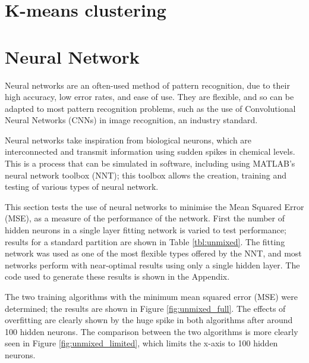 \documentclass[a4paper, 10pt, conference]{ieeeconf}
\begin{document}
\section{K-means clustering}

\section{Neural Network}


Neural networks are an often-used method of pattern recognition, due to their high accuracy, low error rates, and ease of use. They are flexible, and so can be adapted to most pattern recognition problems, such as the use of Convolutional Neural Networks (CNNs) in image recognition, an industry standard.

Neural networks take inspiration from biological neurons, which are interconnected and transmit information using sudden spikes in chemical levels. This is a process that can be simulated in software, including using MATLAB's neural network toolbox (NNT); this toolbox allows the creation, training and testing of various types of neural network.

This section tests the use of neural networks to minimise the Mean Squared Error (MSE), as a measure of the performance of the network. First the number of hidden neurons in a single layer fitting network is varied to test performance; results for a standard partition are shown in Table \ref{tbl:unmixed}. The fitting network was used as one of the most flexible types offered by the NNT, and most networks perform with near-optimal results using only a single hidden layer. The code used to generate these results is shown in the Appendix.

The two training algorithms with the minimum mean squared error (MSE) were determined; the results are shown in Figure \ref{fig:unmixed_full}. The effects of overfitting are clearly shown by the huge spike in both algorithms after around 100 hidden neurons. The comparison between the two algorithms is more clearly seen in Figure \ref{fig:unmixed_limited}, which limits the x-axis to 100 hidden neurons.
\end{document}
